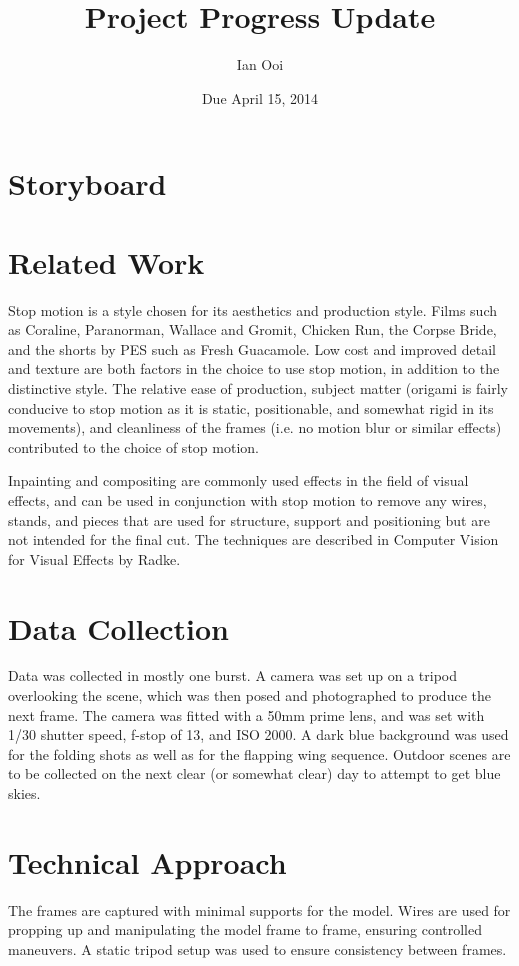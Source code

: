 \documentclass[12pt]{article}
\title{Project Progress Update}
\author{Ian Ooi}
\date{Due April 15, 2014}
\begin{document}
	\maketitle
	\section{Storyboard}
		
	\section{Related Work}
		Stop motion is a style chosen for its aesthetics and production style.  Films such as Coraline, Paranorman, Wallace and Gromit, Chicken Run, the Corpse Bride, and the shorts by PES such as Fresh Guacamole.  Low cost and improved detail and texture are both factors in the choice to use stop motion, in addition to the distinctive style.  The relative ease of production, subject matter (origami is fairly conducive to stop motion as it is static, positionable, and somewhat rigid in its movements), and cleanliness of the frames (i.e. no motion blur or similar effects) contributed to the choice of stop motion.
		
		Inpainting and compositing are commonly used effects in the field of visual effects, and can be used in conjunction with stop motion to remove any wires, stands, and pieces that are used for structure, support and positioning but are not intended for the final cut.  The techniques are described in Computer Vision for Visual Effects by Radke.
		
	\section{Data Collection}
		Data was collected in mostly one burst.  A  camera was set up on a tripod overlooking the scene, which was then posed and photographed to produce the next frame.  The camera was fitted with a 50mm prime lens, and was set with 1/30 shutter speed, f-stop of 13, and ISO 2000.  A dark blue background was used for the folding shots as well as for the flapping wing sequence.  Outdoor scenes are to be collected on the next clear (or somewhat clear) day to attempt to get blue skies.
		
	\section{Technical Approach}
		The frames are captured with minimal supports for the model.  Wires are used for propping up and manipulating the model frame to frame, ensuring controlled maneuvers.  A static tripod setup was used to ensure consistency between frames.	
\end{document}
